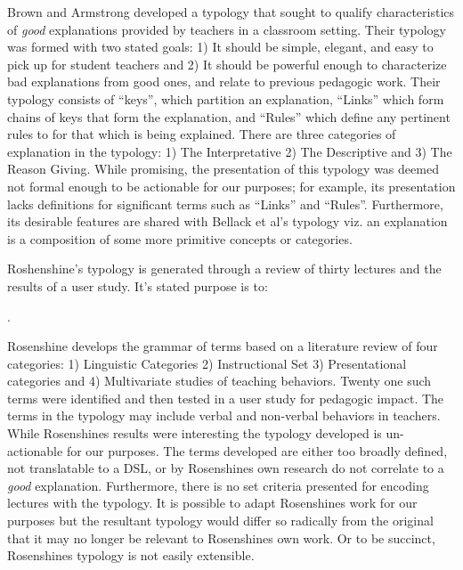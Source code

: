 \documentclass[conference]{IEEEtran}
\begin{document}
Brown and Armstrong\cite{brown1984explaining} developed a typology that sought
to qualify characteristics of \emph{good} explanations provided by teachers in a
classroom setting. Their typology was formed with two stated goals: 1) It should
be simple, elegant, and easy to pick up for student teachers and 2) It should be
powerful enough to characterize bad explanations from good ones, and relate to
previous pedagogic work. Their typology consists of ``keys'', which partition an
explanation, ``Links'' which form chains of keys that form the
explanation, and ``Rules'' which define any pertinent rules to for that which is
being explained. There are three categories of explanation in the typology: 1) The
Interpretative 2) The Descriptive and 3) The Reason Giving. While promising,
the presentation of this typology was deemed not formal enough to be actionable
for our purposes; for example, its presentation lacks definitions for significant terms
such as ``Links'' and ``Rules''. Furthermore, its desirable features are shared
with Bellack et al's typology viz. an explanation is a composition of some more
primitive concepts or categories.

Roshenshine's\cite{rosenshine1968objectively} typology is generated through a
review of thirty lectures and the results of a user study. It's stated purpose
is to:

. 

Rosenshine develops the grammar of terms based on a literature review of four
categories: 1) Linguistic Categories 2) Instructional Set 3) Presentational
categories and 4) Multivariate studies of teaching behaviors. Twenty one such
terms were identified and then tested in a user study for pedagogic impact. The
terms in the typology may include verbal and non-verbal behaviors in teachers.
While Rosenshines results were interesting the typology developed is
un-actionable for our purposes. The terms developed are either too broadly
defined, not translatable to a DSL, or by Rosenshines own research do not
correlate to a \emph{good} explanation. Furthermore, there is no set criteria
presented for encoding lectures with the typology. It is possible to adapt
Rosenshines work for our purposes but the resultant typology would differ so
radically from the original that it may no longer be relevant to Rosenshines own
work. Or to be succinct, Rosenshines typology is not easily extensible.
\end{document}
